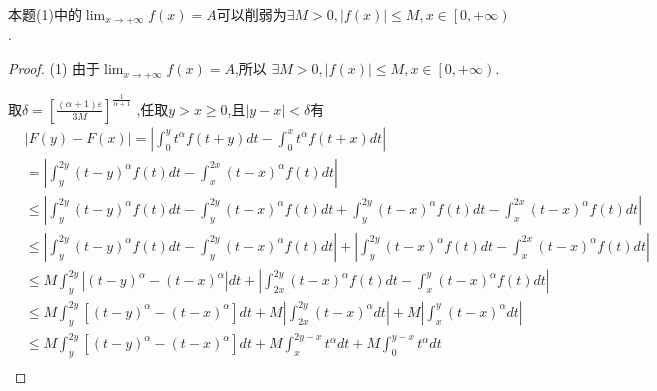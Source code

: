 \documentclass[lang=cn,newtx,10pt,scheme=chinese]{elegantbook}
\begin{document}
\begin{note}
  本题(1)中的$\lim_{x\rightarrow +\infty} f\left( x \right) =A$可以削弱为$\exists M>0,\left| f\left( x \right) \right|\leqslant M,x\in \left[ 0,+\infty \right) $.
\end{note}

\begin{proof}
(1)
由于$\lim_{x\rightarrow +\infty} f\left( x \right) =A$,所以
$\exists M>0,\left| f\left( x \right) \right|\leqslant M,x\in \left[ 0,+\infty \right) $.

取$\delta =\left[ \frac{\left( \alpha +1 \right) \varepsilon}{3M} \right] ^{\frac{1}{\alpha +1}}$
,任取$y>x \geqslant 0$,且$\left| y-x \right|<\delta $有
\begin{equation}
  \begin{split}
    &\left| F\left( y \right) -F\left( x \right) \right|=\left| \int_0^y{t^{\alpha}}f\left( t+y \right) dt-\int_0^x{t^{\alpha}}f\left( t+x \right) dt \right|
\\
&=\left| \int_y^{2y}{\left( t-y \right) ^{\alpha}}f\left( t \right) dt-\int_x^{2x}{\left( t-x \right) ^{\alpha}}f\left( t \right) dt \right|
\\
&\leqslant \left| \int_y^{2y}{\left( t-y \right) ^{\alpha}}f\left( t \right) dt-\int_y^{2y}{\left( t-x \right) ^{\alpha}}f\left( t \right) dt+\int_y^{2y}{\left( t-x \right) ^{\alpha}}f\left( t \right) dt-\int_x^{2x}{\left( t-x \right) ^{\alpha}}f\left( t \right) dt \right|
\\
&\leqslant \left| \int_y^{2y}{\left( t-y \right) ^{\alpha}}f\left( t \right) dt-\int_y^{2y}{\left( t-x \right) ^{\alpha}}f\left( t \right) dt \right|+\left| \int_y^{2y}{\left( t-x \right) ^{\alpha}}f\left( t \right) dt-\int_x^{2x}{\left( t-x \right) ^{\alpha}}f\left( t \right) dt \right|
\\
&\leqslant M\int_y^{2y}{\left| \left( t-y \right) ^{\alpha}-\left( t-x \right) ^{\alpha} \right|}dt+\left| \int_{2x}^{2y}{\left( t-x \right) ^{\alpha}}f\left( t \right) dt-\int_x^y{\left( t-x \right) ^{\alpha}}f\left( t \right) dt \right|
\\
&\leqslant M\int_y^{2y}{\left[ \left( t-y \right) ^{\alpha}-\left( t-x \right) ^{\alpha} \right]}dt+M\left| \int_{2x}^{2y}{\left( t-x \right) ^{\alpha}}dt \right|+M\left| \int_x^y{\left( t-x \right) ^{\alpha}}dt \right|
\\
&\leqslant M\int_y^{2y}{\left[ \left( t-y \right) ^{\alpha}-\left( t-x \right) ^{\alpha} \right]}dt+M\int_x^{2y-x}{t^{\alpha}}dt+M\int_0^{y-x}{t^{\alpha}}dt
\\

\end{split}
\end{equation}
\end{proof}
\end{document}
